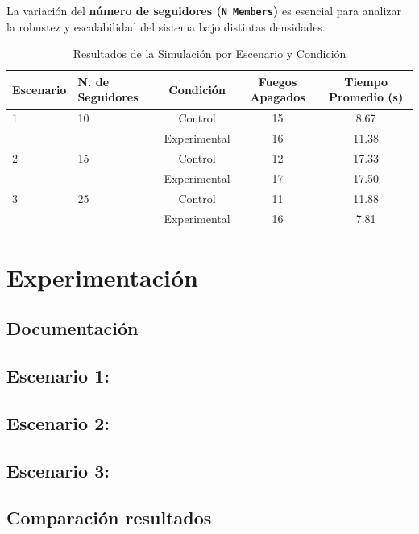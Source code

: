 \documentclass{article}
\begin{document}
La variación del \textbf{número de seguidores (\texttt{N Members})} es esencial para analizar la robustez y escalabilidad del sistema bajo distintas densidades.

\begin{table}[H]
\centering
\caption{Resultados de la Simulación por Escenario y Condición}
\label{tab:results}
\begin{tabular}{llccc}
\toprule
\textbf{Escenario} & \textbf{N. de Seguidores} & \textbf{Condición} & \textbf{Fuegos Apagados} & \textbf{Tiempo Promedio (s)} \\
\midrule
1 & 10 & Control      & 15 & 8.67  \\
  &    & Experimental & 16 & 11.38 \\
\midrule
2 & 15 & Control      & 12 & 17.33 \\
  &    & Experimental & 17 & 17.50 \\
\midrule
3 & 25 & Control      & 11 & 11.88 \\
  &    & Experimental & 16 & 7.81  \\
\bottomrule
\end{tabular}
\end{table}



\section{Experimentación}\label{sec:exp}

\subsection{Documentación}


\subsection{Escenario 1:}


\subsection{Escenario 2:}

\subsection{Escenario 3:}

\subsection{Comparación resultados}
\end{document}
